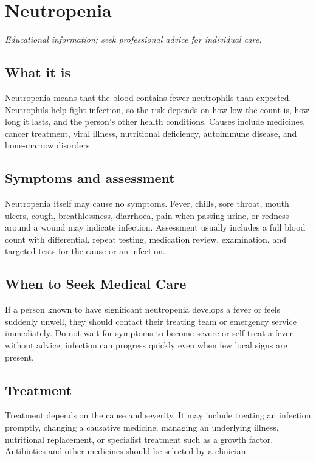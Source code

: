 \chapter{Neutropenia}

\medskip
\noindent\textit{Educational information; seek professional advice for individual care.}

\section*{What it is}
Neutropenia means that the blood contains fewer neutrophils than expected. Neutrophils help fight infection, so the risk depends on how low the count is, how long it lasts, and the person’s other health conditions. Causes include medicines, cancer treatment, viral illness, nutritional deficiency, autoimmune disease, and bone-marrow disorders.

\section*{Symptoms and assessment}
Neutropenia itself may cause no symptoms. Fever, chills, sore throat, mouth ulcers, cough, breathlessness, diarrhoea, pain when passing urine, or redness around a wound may indicate infection. Assessment usually includes a full blood count with differential, repeat testing, medication review, examination, and targeted tests for the cause or an infection.

\section*{When to Seek Medical Care}
If a person known to have significant neutropenia develops a fever or feels suddenly unwell, they should contact their treating team or emergency service immediately. Do not wait for symptoms to become severe or self-treat a fever without advice; infection can progress quickly even when few local signs are present.

\section*{Treatment}
Treatment depends on the cause and severity. It may include treating an infection promptly, changing a causative medicine, managing an underlying illness, nutritional replacement, or specialist treatment such as a growth factor. Antibiotics and other medicines should be selected by a clinician.

